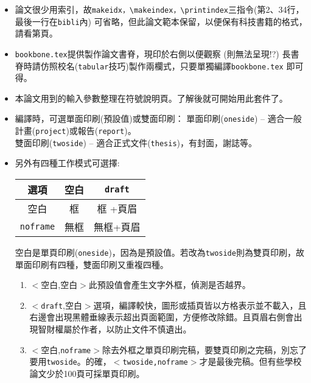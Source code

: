 \begin{itemize}
\item {\color{red}論文很少用索引，故{\tt makeidx，\textbackslash makeindex，\textbackslash printindex}三指令(第2、34行，最後一行在{\tt bibli}內) 可省略，但此論文範本保留，以便保有科技書籍的格式，請看第\framebox{\pageref{others}}頁。}

\item {\tt bookbone.tex}提供製作論文書脊，現印於右側以便觀察 (\XeLaTeX{}則無法呈現!?) 
長書脊時請仿照校名({\tt tabular}技巧)製作兩欄式，只要單獨編譯{\tt bookbone.tex} 即可得。 

\item 本論文用到的輸入參數整理在符號說明頁。了解後就可開始用此套件了。\label{conclude}

\item 編譯時，可選單面印刷(預設值)或雙面印刷： %
單面印刷({\tt oneside}) -- 適合一般計畫({\tt project})或報告({\tt report})。\\
雙面印刷({\tt twoside}) -- 適合正式文件({\tt thesis})，有封面，謝誌等。
\item 另外有四種工作模式可選擇:\\ 
  
{\color{blue}
\begin{center}
\begin{tabular}{|c|c|c|} \hline 
 選項          &  空白    &  {\tt  draft}      \\ \hline 
 空白          &    框    &    框 +頁眉      \\ \hline
{\tt noframe}  &    無框  &    無框+頁眉   \\ \hline
\end{tabular}
\end{center}
}
空白是單頁印刷({\tt oneside})，因為是預設值。若改為{\tt twoside}則為雙頁印刷，故單面印刷有四種，雙面印刷又重複四種。

\begin{enumerate}
\item $<$空白,空白$>$此預設值會產生文字外框，偵測是否越界。
\item $<${\tt draft},空白$>$選項，編譯較快，圖形或插頁皆以方格表示並不載入，且右邊會出現黑體垂線表示超出頁面範圍，方便修改除錯。且頁眉右側會出現智財權屬於作者，以防止文件不慎遺出。
\item$<$空白,{\tt noframe}$>$除去外框之{\color{red}單頁印刷完稿}，要雙頁印刷之完稿，別忘了要用{\tt twoside}{\color{red}。的確，$<${\tt twoside,noframe}$>$才是最後完稿。}但有些學校論文少於100頁可採單頁印刷。



\end{enumerate}
\end{itemize}
